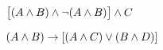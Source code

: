 \begin{earg}
\item $\bigl[(A\wedge B) \wedge\neg(A\wedge B)\bigr] \wedge C$ \vspace{.5ex}	
%
%
%
%
%
\item $(A \wedge B) \rightarrow[(A \wedge C) \vee (B \wedge D)]$ \vspace{.5ex}		
%
%
%
\end{earg}

